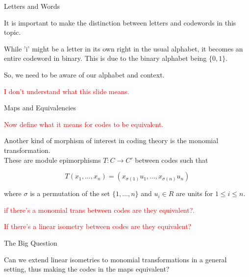 \documentclass{beamer}
\begin{document}
\begin{frame}{Letters and Words}

    It is important to make the distinction between letters and codewords in this topic.
    
    \bigskip

    While 'i' might be a letter in its own right in the usual alphabet, it becomes an entire codeword
    in binary. This is due to the binary alphabet being $\{0,1\}$.

    \bigskip

    \pause

    So, we need to be aware of our alphabet and context.
    
    
    \textcolor{red}{I don't understand what this slide means.}
    

    
\end{frame}

\begin{frame}{Maps and Equivalencies}


    \textcolor{red}{Now define what it means for codes to be equivalent.}
    

    
    Another kind of morphism of interest in coding theory is the monomial transformation.\\
    These are module epimorphisms $T:C\to C'$ between codes such that

    $$T(x_1,\ldots,x_n)=(x_{\sigma(1)}u_1,\ldots,x_{\sigma(n)}u_n)$$
    
    where $\sigma$ is a permutation of the set $\{1,\ldots,n\}$ and $u_i\in R$ are units for
    $1\leq i\leq n$.
    
    
    
    \textcolor{red}{if there's a monomial trans between codes are they equivalent?.}
    
    
    \textcolor{red}{If there's a linear isometry between codes are they equivalent?}
    

    


\end{frame}

\begin{frame}{The Big Question}
    
    Can we extend linear isometries to monomial transformations in a general setting, thus making the
    codes in the maps equivalent?

\end{frame}
\end{document}
